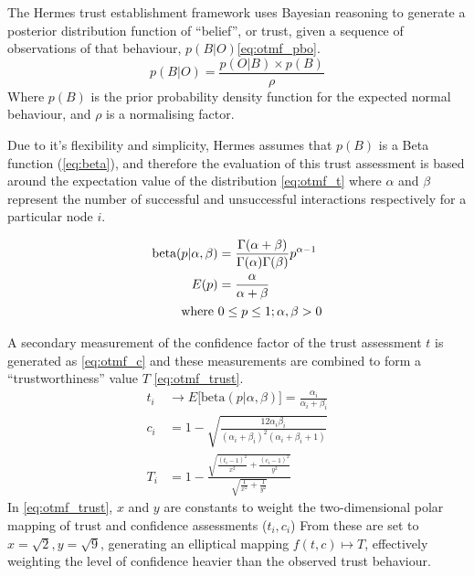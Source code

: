 The Hermes trust establishment framework \cite{Zouridaki2005} uses Bayesian reasoning to generate a posterior distribution function of ``belief'', or trust, given a sequence of observations of that behaviour, $p(B|O)$\eqref{eq:otmf_pbo}.
%
\begin{equation}
  p(B|O)  = \frac{p(O|B) \times p(B)}{\rho}
  \label{eq:otmf_pbo}
\end{equation}
%
Where $p(B)$ is the prior probability density function for the expected normal behaviour, and $\rho$ is a normalising factor.

Due to it's flexibility and simplicity, Hermes assumes that $p(B)$ is a Beta function (\eqref{eq:beta}), and therefore the evaluation of this trust assessment is based around the expectation value of the distribution \eqref{eq:otmf_t}  where $\alpha$ and $\beta$ represent the number of successful and unsuccessful interactions respectively for a particular node $i$.

\begin{align}
  \label{eq:beta}
  \text{beta}(p|\alpha,\beta) &= \frac{\Gamma(\alpha + \beta)}{\Gamma(\alpha)\Gamma(\beta)}p^{\alpha-1}\\
  \label{eq:beta_e}
  E(p) &= \frac{\alpha}{\alpha + \beta}\\
  \text{where } &0 \leq p \leq 1; \alpha,\beta > 0 \notag
\end{align}
%

A secondary measurement of the confidence factor of the trust assessment $t$ is generated as \eqref{eq:otmf_c} and these measurements are combined to form a ``trustworthiness'' value $T$ \eqref{eq:otmf_trust}.
%
\begin{align}
  t_i &\to E\lbrack\text{beta}(p|\alpha,\beta)\rbrack = \frac{\alpha_i}{\alpha_i+\beta_i} \label{eq:otmf_t}\\[5pt]
  c_i &= 1 - \sqrt{\frac{12\alpha_i\beta_i}{(\alpha_i+\beta_i)^2(\alpha_i+\beta_i+1)}} \label{eq:otmf_c}\\[5pt]
  T_i &= 1 - \frac{\sqrt{\frac{(t_i-1)^2}{x^2} + \frac{(c_i-1)^2}{y^2}}}{\sqrt{\frac{1}{x^2}+\frac{1}{y^2}}} \label{eq:otmf_trust}
\end{align}
%
In \eqref{eq:otmf_trust}, $x$ and $y$ are constants to weight the two-dimensional polar mapping of trust and confidence assessments ($t_i,c_i$)
From \citet{Zouridaki2005} these are set to $x=\sqrt{2},y=\sqrt{9}$, generating an elliptical mapping $f(t,c) \mapsto T$, effectively weighting the level of confidence heavier than the observed trust behaviour.

